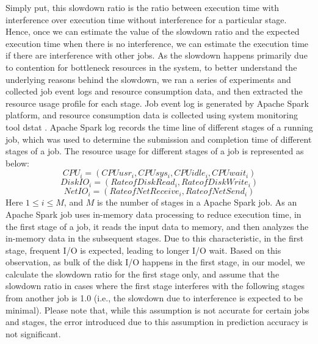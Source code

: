 Simply put, this slowdown ratio is the ratio between execution time with interference over execution time without interference for a particular stage. Hence, once we can estimate the value of the slowdown ratio and the expected execution time when there is no interference, we can estimate the execution time if there are interference with other jobs. 
\noindent
As the slowdown happens primarily due to contention for bottleneck resources in the system, to better understand the underlying reasons behind the slowdown, we ran a series of experiments and collected job event logs and resource consumption data, and then extracted the resource usage profile for each stage. Job event log is generated by Apache Spark platform, and resource consumption data is collected using system monitoring tool dstat \cite{dstat}. Apache Spark log records the time line of different stages of a running job, which was used to determine the submission and completion time of different stages of a job. The resource usage for different stages of a job is represented as below: 
\begin{equation}
\label{cpu}
CPU_i 
= (CPUusr_i, CPUsys_i, CPUidle_i, CPUwait_i) 
\end{equation}
\begin{equation}
\label{diskio}
DiskIO_i = (RateofDiskRead_i, RateofDiskWrite_i)
\end{equation}
\begin{equation}
\label{netio}
NetIO_i = (RateofNetReceive_i, RateofNetSend_i)
\end{equation}
Here $1 \leq i \leq M$, and $M$ is the number of stages in a Apache Spark job.
\noindent 
As an Apache Spark job uses in-memory data processing to reduce execution time, in the first stage of a job, it reads the input data to memory, and then analyzes the in-memory data in the subsequent stages. Due to this characteristic, in the first stage, frequent I/O is expected, leading to longer I/O wait. Based on this observation, as bulk of the disk I/O happens in the first stage, in our model, we calculate the slowdown ratio for the first stage only, and assume that the slowdown ratio in cases where the first stage interferes with the following stages from another job is 1.0 (i.e., the slowdown due to interference is expected to be minimal). Please note that, while this assumption is not accurate for certain jobs and stages, the error introduced due to this assumption in prediction accuracy is not significant. 

